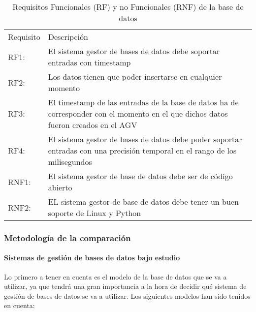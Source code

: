 \begin{table}[H]
    \begin{tabularx}{\textwidth}{l X}
        \toprule
        Requisito                 & Descripción \\
        \otoprule
        RF1:                & El sistema gestor de bases de datos debe soportar entradas con timestamp \\
        \rowcolor{gray!35}
        RF2:                & Los datos tienen que poder insertarse en cualquier momento \\
        RF3:                & El timestamp de las entradas de la base de datos ha de corresponder con el momento en el que dichos datos fueron creados en el AGV \\
        \rowcolor{gray!35}
        RF4:                & El sistema gestor de bases de datos debe poder soportar entradas con una precisión temporal en el rango de los milisegundos \\
        RNF1:                & El sistema gestor de base de datos debe ser de código abierto \\
        \rowcolor{gray!35}
        RNF2:                & EL sistema gestor de base de datos debe tener un buen soporte de Linux y Python \\
        \bottomrule
    \end{tabularx}
    \caption{Requisitos Funcionales (RF) y no Funcionales (RNF) de la base de datos}
    \label{tabla:req}
\end{table}

\subsubsection*{Metodología de la comparación}

\paragraph*{Sistemas de gestión de bases de datos bajo estudio}

Lo primero a tener en cuenta es el modelo de la base de datos que se va a utilizar, ya que tendrá una gran importancia
a la hora de decidir qué sistema de gestión de bases de datos se va a utilizar. Los siguientes modelos \cite{10.5555/3364297} han sido
tenidos en cuenta: 

